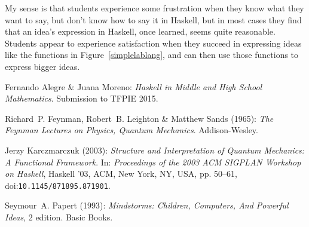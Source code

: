 \documentclass{eptcs}
\begin{document}
My sense is that students experience some frustration
when they know what they want to say, but don't know how to say it
in Haskell, but in most cases they find that an idea's expression
in Haskell, once learned, seems quite reasonable.  Students appear
to experience
satisfaction when they succeed in expressing ideas like the functions in
Figure~\ref{simplelablang}, and can then use those functions
to express bigger ideas.

\begin{thebibliography}{10}
\providecommand{\bibitemdeclare}[2]{}
\providecommand{\surnamestart}{}
\providecommand{\surnameend}{}
\providecommand{\urlprefix}{Available at }
\providecommand{\url}[1]{\texttt{#1}}
\providecommand{\href}[2]{\texttt{#2}}
\providecommand{\urlalt}[2]{\href{#1}{#2}}
\providecommand{\doi}[1]{doi:\urlalt{http://dx.doi.org/#1}{#1}}
\providecommand{\bibinfo}[2]{#2}

\bibitemdeclare{unpublished}{alegreTFPIE2015}
\bibinfo{author}{Fernando \surnamestart Alegre\surnameend} \&
  \bibinfo{author}{Juana \surnamestart Moreno\surnameend}:
  \emph{\bibinfo{title}{Haskell in Middle and High School Mathematics}}.
\newblock \bibinfo{note}{Submission to TFPIE 2015}.

\bibitemdeclare{book}{feynmanlectures3}
\bibinfo{author}{Richard~P. \surnamestart Feynman\surnameend},
  \bibinfo{author}{Robert~B. \surnamestart Leighton\surnameend} \&
  \bibinfo{author}{Matthew \surnamestart Sands\surnameend}
  (\bibinfo{year}{1965}): \emph{\bibinfo{title}{The Feynman Lectures on
  Physics, Quantum Mechanics}}.
\newblock \bibinfo{publisher}{Addison-Wesley}.

\bibitemdeclare{inproceedings}{karczmarczuk2003}
\bibinfo{author}{Jerzy \surnamestart Karczmarczuk\surnameend}
  (\bibinfo{year}{2003}): \emph{\bibinfo{title}{Structure and Interpretation of
  Quantum Mechanics: A Functional Framework}}.
\newblock In: {\sl \bibinfo{booktitle}{Proceedings of the 2003 ACM SIGPLAN
  Workshop on Haskell}}, \bibinfo{series}{Haskell '03},
  \bibinfo{publisher}{ACM}, \bibinfo{address}{New York, NY, USA}, pp.
  \bibinfo{pages}{50--61}, \doi{10.1145/871895.871901}.

\bibitemdeclare{book}{papert}
\bibinfo{author}{Seymour~A. \surnamestart Papert\surnameend}
  (\bibinfo{year}{1993}): \emph{\bibinfo{title}{Mindstorms: Children,
  Computers, And Powerful Ideas}}, \bibinfo{edition}{2} edition.
\newblock \bibinfo{publisher}{Basic Books}.


\end{thebibliography}
\end{document}
